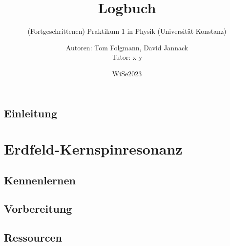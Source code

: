 \documentclass[
    twoside=true, 
    footinclude=off, 
    captions=tableheading, 
    DIV=12;usenames,
    dvipsnames
]{scrbook}
\begin{document}
    \title{Logbuch}
    \subtitle{(Fortgeschrittenen) Praktikum 1 in Physik (Universität Konstanz)}
    \author{Autoren: Tom Folgmann, David Jannack \\ \large{Tutor: x y}}
    \date{WiSe2023}
    \maketitle
    \thispagestyle{empty}
    \section*{Einleitung}
        

    \newpage


    \tableofcontents

\newtheorem{quest}{Vorbereitungsthema}
\newtheorem{answ}{Antwort }
\newenvironment{Frage}{%
    \begin{center}
        \dotfill\parskip1em

        \begin{minipage}{0.95\textwidth}
            \begin{quest}\end{quest}
}{
        \end{minipage}\par
        \dotfill
    \end{center}
}
\newenvironment{Antwort}{

}{

}



\newpage

\chapter{Erdfeld-Kernspinresonanz}
    \section{Kennenlernen}
        

    \newpage
    \section{Vorbereitung}
        

    \newpage
    \section{Ressourcen}
        




%
\end{document}
